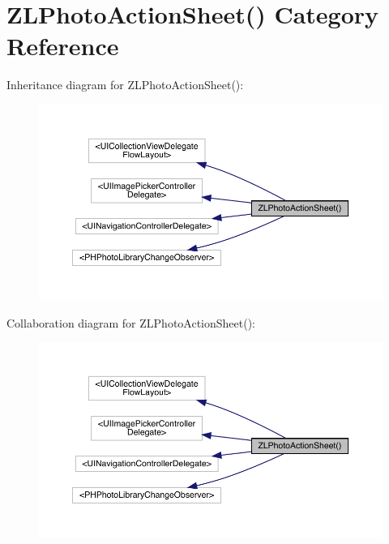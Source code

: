 \hypertarget{category_z_l_photo_action_sheet_07_08}{}\section{Z\+L\+Photo\+Action\+Sheet() Category Reference}
\label{category_z_l_photo_action_sheet_07_08}


Inheritance diagram for Z\+L\+Photo\+Action\+Sheet()\+:\nopagebreak
\begin{figure}[H]
\begin{center}
\leavevmode
\includegraphics[width=350pt]{category_z_l_photo_action_sheet_07_08__inherit__graph}
\end{center}
\end{figure}


Collaboration diagram for Z\+L\+Photo\+Action\+Sheet()\+:\nopagebreak
\begin{figure}[H]
\begin{center}
\leavevmode
\includegraphics[width=350pt]{category_z_l_photo_action_sheet_07_08__coll__graph}
\end{center}
\end{figure}
